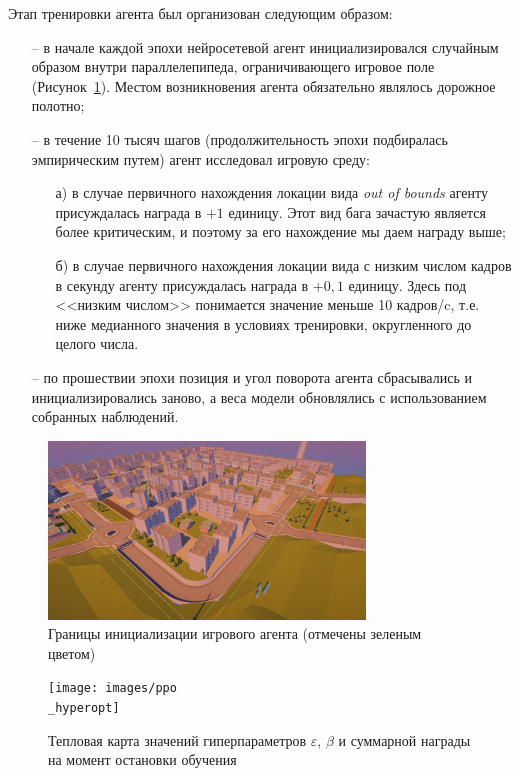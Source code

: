 Этап тренировки агента был организован следующим образом:
\begin{itemize}
	\item[--] в начале каждой эпохи нейросетевой агент инициализировался случайным образом внутри параллелепипеда, ограничивающего игровое поле (Рисунок~\ref{fig:bounds}). Местом возникновения агента обязательно являлось дорожное полотно;
	\item[--] в течение 10 тысяч шагов (продолжительность эпохи подбиралась эмпирическим путем) агент исследовал игровую среду:
	\begin{itemize}
		\item[а)] в случае первичного нахождения локации вида \textit{out of bounds} агенту присуждалась награда в \(+1\) единицу. Этот вид бага зачастую является более критическим, и поэтому за его нахождение мы даем награду выше;
		\item[б)] в случае первичного нахождения локации вида с низким числом кадров в секунду агенту присуждалась награда в \(+0,1\) единицу. Здесь под <<низким числом>> понимается значение меньше 10 кадров/c, т.е. ниже медианного значения в условиях тренировки, округленного до целого числа. 
	\end{itemize}
	\item[--] по прошествии эпохи позиция и угол поворота агента сбрасывались и инициализировались заново, а веса модели обновлялись с использованием собранных наблюдений.
\end{itemize}

\begin{figure}
	\centering
	\includegraphics[width=0.75\textwidth]{images/bounds}
	\caption{Границы инициализации игрового агента (отмечены зеленым цветом)}
	\label{fig:bounds}
\end{figure}

\begin{figure}
	\centering
	\texttt{[image: images/ppo\\\_hyperopt]}
	\caption{Тепловая карта значений гиперпараметров \(\varepsilon\), \(\beta\) и суммарной награды на момент остановки обучения}
	\label{fig:hyperopt}
\end{figure}

